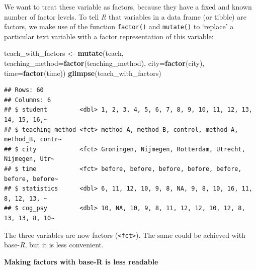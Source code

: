 \documentclass[
]{scrartcl}
\newenvironment{Shaded}{\begin{snugshade}}{\end{snugshade}}
\newcommand{\AttributeTok}[1]{\textcolor[rgb]{0.13,0.29,0.53}{#1}}
\newcommand{\FunctionTok}[1]{\textcolor[rgb]{0.13,0.29,0.53}{\textbf{#1}}}
\newcommand{\NormalTok}[1]{#1}
\newcommand{\OtherTok}[1]{\textcolor[rgb]{0.56,0.35,0.01}{#1}}
\newcommand{\SpecialCharTok}[1]{\textcolor[rgb]{0.81,0.36,0.00}{\textbf{#1}}}
\newenvironment{webexsolution}[1]
    {\par\tiny\textbf{#1}}
    {\par}
\newcommand{\webexhide}[1]{\begin{webexsolution}{#1}}
\begin{document}
We want to treat these variable as factors, because they have a fixed and known number of factor levels. To tell \emph{R} that variables in a data frame (or tibble) are factors, we make use of the function \texttt{factor()} and \texttt{mutate()} to `replace' a particular text variable with a factor representation of this variable:

\begin{Shaded}
\begin{Highlighting}[]
\NormalTok{teach\_with\_factors }\OtherTok{\textless{}{-}} \FunctionTok{mutate}\NormalTok{(teach,}
                       \AttributeTok{teaching\_method=}\FunctionTok{factor}\NormalTok{(teaching\_method),}
                       \AttributeTok{city=}\FunctionTok{factor}\NormalTok{(city),}
                       \AttributeTok{time=}\FunctionTok{factor}\NormalTok{(time))}
\FunctionTok{glimpse}\NormalTok{(teach\_with\_factors)}
\end{Highlighting}
\end{Shaded}

\begin{verbatim}
## Rows: 60
## Columns: 6
## $ student         <dbl> 1, 2, 3, 4, 5, 6, 7, 8, 9, 10, 11, 12, 13, 14, 15, 16,~
## $ teaching_method <fct> method_A, method_B, control, method_A, method_B, contr~
## $ city            <fct> Groningen, Nijmegen, Rotterdam, Utrecht, Nijmegen, Utr~
## $ time            <fct> before, before, before, before, before, before, before~
## $ statistics      <dbl> 6, 11, 12, 10, 9, 8, NA, 9, 8, 10, 16, 11, 8, 12, 13, ~
## $ cog_psy         <dbl> 10, NA, 10, 9, 8, 11, 12, 12, 10, 12, 8, 13, 13, 8, 10~
\end{verbatim}

The three variables are now factors (\texttt{\textless{}fct\textgreater{}}). The same could be achieved with base-\emph{R}, but it is less convenient.

\webexhide{Making factors with base-R is less readable}

\begin{Shaded}
\end{Shaded}
\end{document}
